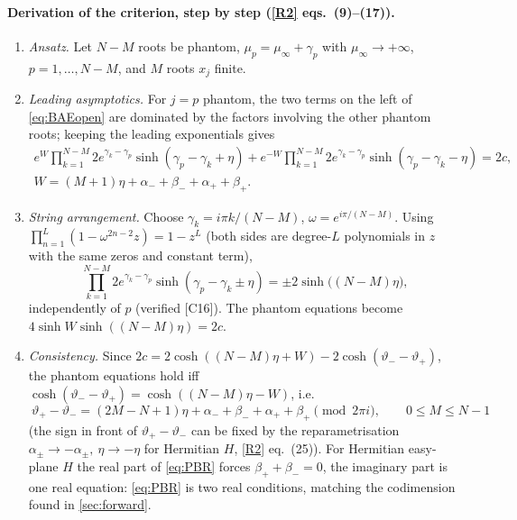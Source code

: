\documentclass[11pt,a4paper]{article}
\theoremstyle{definition}
\newcommand{\ver}[1]{\textsf{[#1]}}   %
\begin{document}
\paragraph{Derivation of the criterion, step by step (\ref{R2} eqs.~(9)--(17)).}
\begin{enumerate}[label=\arabic*.]
\item \emph{Ansatz.} Let $N-M$ roots be phantom, $\mu_p=\mu_\infty+\gamma_p$ with $\mu_\infty\to+\infty$, $p=1,\dots,N-M$, and $M$ roots $x_j$ finite.
\item \emph{Leading asymptotics.} For $j=p$ phantom, the two terms on the left of \eqref{eq:BAEopen} are dominated by the factors involving the other phantom roots; keeping the leading exponentials gives
\begin{equation}
\begin{gathered}
e^{W}\prod_{k=1}^{N-M}2e^{\gamma_k-\gamma_p}\sinh(\gamma_p-\gamma_k+\eta)+e^{-W}\prod_{k=1}^{N-M}2e^{\gamma_k-\gamma_p}\sinh(\gamma_p-\gamma_k-\eta)=2c,\\
W=(M+1)\eta+\alpha_-+\beta_-+\alpha_++\beta_+ .
\end{gathered}
\end{equation}
\item \emph{String arrangement.} Choose $\gamma_k=i\pi k/(N-M)$, $\omega=e^{i\pi/(N-M)}$. Using $\prod_{n=1}^{L}(1-\omega^{2n-2}z)=1-z^{L}$ (both sides are degree-$L$ polynomials in $z$ with the same zeros and constant term),
\begin{equation}\label{eq:string-identity}
\prod_{k=1}^{N-M}2e^{\gamma_k-\gamma_p}\sinh(\gamma_p-\gamma_k\pm\eta)=\pm2\sinh\big((N-M)\eta\big),
\end{equation}
independently of $p$ (verified \ver{C16}). The phantom equations become $4\sinh W\sinh((N-M)\eta)=2c$.
\item \emph{Consistency.} Since $2c=2\cosh((N-M)\eta+W)-2\cosh(\vartheta_--\vartheta_+)$, the phantom equations hold iff $\cosh(\vartheta_--\vartheta_+)=\cosh((N-M)\eta-W)$, i.e.
\begin{equation}\label{eq:PBR}
\boxed{\ \vartheta_+-\vartheta_-=(2M-N+1)\eta+\alpha_-+\beta_-+\alpha_++\beta_+\pmod{2\pi i},\qquad 0\le M\le N-1\ }
\end{equation}
(the sign in front of $\vartheta_+-\vartheta_-$ can be fixed by the reparametrisation $\alpha_\pm\to-\alpha_\pm,\ \eta\to-\eta$ for Hermitian $H$, \ref{R2} eq.~(25)). For Hermitian easy-plane $H$ the real part of \eqref{eq:PBR} forces $\beta_++\beta_-=0$, the imaginary part is one real equation: \eqref{eq:PBR} is two real conditions, matching the codimension found in \cref{sec:forward}.

\end{enumerate}
\end{document}
